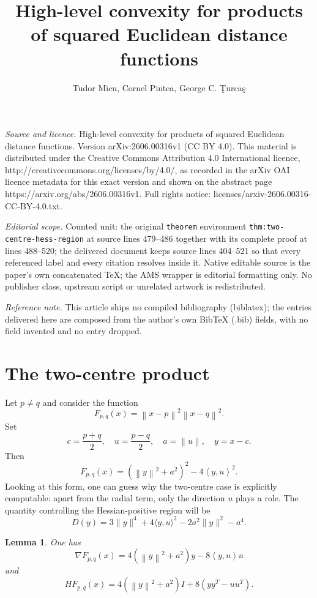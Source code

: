 \documentclass[10pt,a4paper]{amsart}
\newtheorem{lemma}[theorem]{Lemma}
\newcommand{\ip}[2]{\left\langle #1,#2\right\rangle}
\newcommand{\norm}[1]{\left\lVert #1\right\rVert}
\begin{document}
\title[High-level convexity for products of squared Euclidean dista]{High-level convexity for products of squared Euclidean distance functions}
\author{Tudor Micu, Cornel Pintea, George C. Ţurcaş}
\date{}
\maketitle
\noindent\emph{Source and licence.} High-level convexity for products of squared Euclidean distance functions. Version arXiv:2606.00316v1 (CC BY 4.0). This material is distributed under the Creative Commons Attribution 4.0 International licence, http://creativecommons.org/licenses/by/4.0/, as recorded in the arXiv OAI licence metadata for this exact version and shown on the abstract page https://arxiv.org/abs/2606.00316v1. Full rights notice: licenses/arxiv-2606.00316-CC-BY-4.0.txt.\par\smallskip
\noindent\textit{Editorial scope.} Counted unit: the original \texttt{theorem} environment \texttt{thm:two-centre-hess-region} at source lines 479--486 together with its complete proof at lines 488--520; the delivered document keeps source lines 404--521 so that every referenced label and every citation resolves inside it. Native editable source is the paper's own concatenated TeX; the AMS wrapper is editorial formatting only. No publisher class, upstream script or unrelated artwork is redistributed.
\par\smallskip\noindent\textit{Reference note.} This article ships no compiled bibliography (biblatex); the entries delivered here are composed from the author's own BibTeX (.bib) fields, with no field invented and no entry dropped.
\section{The two-centre product}

Let $p\ne q$ and consider the function
\[
 F_{p,q}(x)=\norm{x-p}^2\norm{x-q}^2.
\]
Set
\[
 c=\frac{p+q}{2},\quad u=\frac{p-q}{2},\quad a=\norm{u},\quad y=x-c.
\]
Then
\[
 F_{p,q}(x)=(\norm{y}^2+a^2)^2-4\ip{y}{u}^2.
\]
Looking at this form, one can guess why the two-centre case is explicitly computable:
apart from the radial term, only the direction \(u\) plays a role.  The
quantity controlling the Hessian-positive region will be
\[
D(y)=3\|y\|^4+4\langle y,u\rangle^2-2a^2\|y\|^2-a^4.
\]


\begin{lemma}\label{lem:two-centre-hessian}
One has
\[
 \nabla F_{p,q}(x)=4(\norm{y}^2+a^2)y-8\ip{y}{u}u
\]
and
\[
 HF_{p,q}(x)=4(\norm{y}^2+a^2)I+8(yy^T-uu^T).
\]
\end{lemma}
\end{document}
